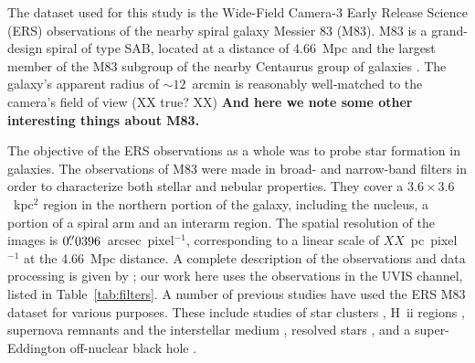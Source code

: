 
The dataset used for this study is the Wide-Field Camera-3
Early Release Science (ERS) observations of the nearby spiral galaxy Messier 83 (M83).
M83 is a grand-design spiral of type SAB, located at a distance of 4.66~Mpc \citep{tully13}
and the largest member of the M83 subgroup of the nearby Centaurus group of galaxies \citep{tully15}.
The galaxy's apparent radius of $\sim12$~arcmin \citep{} is reasonably well-matched to the camera's field of view (XX true? XX)
{\bf And here we note some other interesting things about M83.}

The objective of the ERS observations as a whole was to probe star formation in galaxies.
The observations of M83 were made in broad- and narrow-band filters in order to characterize both stellar and nebular properties.
They cover a $3.6\times3.6$~kpc$^2$ region in the northern portion of the galaxy, including the nucleus,
a portion of a spiral arm and an interarm region.
The spatial resolution of the images is $0\hbox{$.\!\!^{\prime\prime}$}0396$~arcsec~pixel$^{-1}$,
corresponding to a linear scale of $XX$~pc~pixel$^{-1}$ at the 4.66~Mpc distance.
A complete description of the observations and data processing is given by \citet{chandar10};
our work here uses the observations in the UVIS channel, listed in Table~\ref{tab:filters}.
A number of previous studies have used the ERS M83 dataset for various purposes.
These include studies of 
star clusters \citep{chandar10, wofford11, whitmore11, bastian11, bastian12, fouesneau12, silva13, andrews14, chandar14, adamo15,ryon15,hollyhead15, sun16},
H~{\sc ii} regions \citep{liu13}, supernova remnants and the interstellar medium \citep{dopita10, hong11, blair14, blair15}, 
resolved stars \citep{kim12, williams15},
and a super-Eddington off-nuclear black hole \citep{soria14}.


